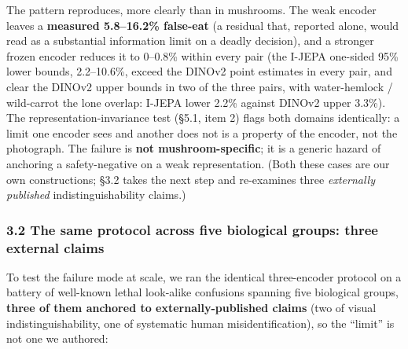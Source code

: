 The pattern reproduces, more clearly than in mushrooms. The weak encoder
leaves a \textbf{measured 5.8--16.2\% false-eat} (a residual that,
reported alone, would read as a substantial information limit on a
deadly decision), and a stronger frozen encoder reduces it to 0--0.8\%
within every pair (the I-JEPA one-sided 95\% lower bounds, 2.2--10.6\%,
exceed the DINOv2 point estimates in every pair, and clear the DINOv2
upper bounds in two of the three pairs, with water-hemlock / wild-carrot
the lone overlap: I-JEPA lower 2.2\% against DINOv2 upper 3.3\%). The
representation-invariance test (§5.1, item 2) flags both domains
identically: a limit one encoder sees and another does not is a property
of the encoder, not the photograph. The failure is \textbf{not
mushroom-specific}; it is a generic hazard of anchoring a
safety-negative on a weak representation. (Both these cases are our own
constructions; §3.2 takes the next step and re-examines three
\emph{externally published} indistinguishability claims.)

\subsubsection{3.2 The same protocol across five biological groups:
three external
claims}\label{the-same-protocol-across-five-biological-groups-three-external-claims}

To test the failure mode at scale, we ran the identical three-encoder
protocol on a battery of well-known lethal look-alike confusions
spanning five biological groups, \textbf{three of them anchored to
externally-published claims} (two of visual indistinguishability, one of
systematic human misidentification), so the ``limit'' is not one we
authored:


